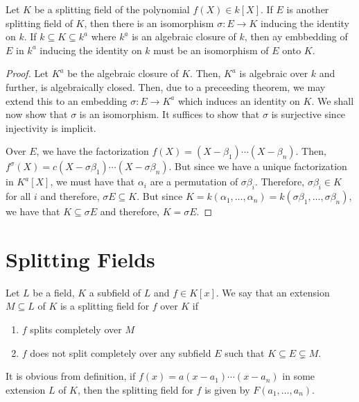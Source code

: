 \begin{theorem}
    Let $K$ be a splitting field of the polynomial $f(X)\in k[X]$. If $E$ is another splitting field of $K$, then there is an isomorphism $\sigma:E\to K$ inducing the identity on $k$. If $k\subseteq K\subseteq k^a$ where $k^a$ is an algebraic closure of $k$, then ay embbedding of $E$ in $k^a$ inducing the identity on $k$ must be an isomorphism of $E$ onto $K$.
\end{theorem}
\begin{proof}
    Let $K^a$ be the algebraic closure of $K$. Then, $K^a$ is algebraic over $k$ and further, is algebraically closed. Then, due to a preceeding theorem, we may extend this to an embedding $\sigma: E\to K^a$ which induces an identity on $K$. We shall now show that $\sigma$ is an isomorphism. It suffices to show that $\sigma$ is surjective since injectivity is implicit.

    Over $E$, we have the factorization $f(X) = (X - \beta_1)\cdots(X- \beta_n)$. Then, $f^\sigma(X) = c(X-\sigma\beta_1)\cdots(X-\sigma\beta_n)$. But since we have a unique factorization in $K^a[X]$, we must have that $\alpha_i$ are a permutation of $\sigma\beta_i$. Therefore, $\sigma\beta_i\in K$ for all $i$ and therefore, $\sigma E\subseteq K$. But since $K = k(\alpha_1,\ldots,\alpha_n) = k(\sigma\beta_1,\ldots,\sigma\beta_n)$, we have that $K\subseteq\sigma E$ and therefore, $K = \sigma E$.
\end{proof}

\section{Splitting Fields}

\begin{definition}
    Let $L$ be a field, $K$ a subfield of $L$ and $f\in K[x]$. We say that an extension $M\subseteq L$ of $K$ is a splitting field for $f$ over $K$ if 
    \begin{enumerate}
        \item $f$ splits completely over $M$ 
        \item $f$ does not split completely over any subfield $E$ such that $K\subseteq E\subsetneq M$.
    \end{enumerate}
\end{definition}

It is obvious from definition, if $f(x) = a(x - a_1)\cdots(x - a_n)$ in some extension $L$ of $K$, then the splitting field for $f$ is given by $F(a_1,\ldots,a_n)$.

